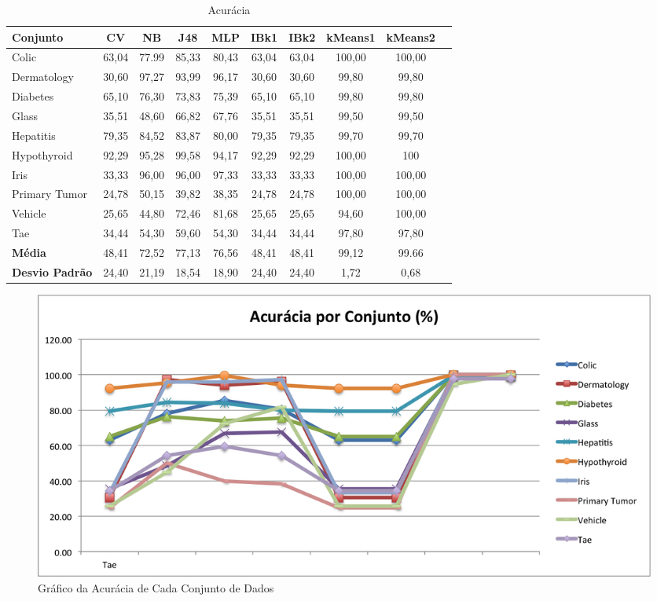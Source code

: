 \documentclass[12pt]{article}
\begin{document}
\begin{table}[h]
	\centering
	\caption{Acurácia }	
	\label{tabelaAcuraciaConjuntoDados}
	\begin{tabular}{lccccccccc}
		\hline
		Conjunto & CV & NB & J48 & MLP & IBk1 & IBk2 & kMeans1 & kMeans2 \\ \hline
		Colic  & 63,04 & 77.99 & 85,33 &80,43 & 63,04 & 63,04 & 100,00 & 100,00 \\ \hline
		Dermatology & 30,60 & 97,27 & 93,99 & 96,17 & 30,60 & 30,60 & 99,80 & 99,80\\ \hline
		Diabetes & 65,10 & 76,30 & 73,83 & 75,39 & 65,10 & 65,10 & 99,80 & 99,80 \\ \hline
		Glass & 35,51 & 48,60 & 66,82 & 67,76 & 35,51 & 35,51 & 99,50 & 99,50 \\ \hline
		Hepatitis & 79,35& 84,52 & 83,87 & 80,00 & 79,35 & 79,35 & 99,70 & 99,70 \\ \hline
		Hypothyroid  & 92,29 & 95,28 & 99,58 & 94,17 & 92,29 & 92,29 & 100,00 & 100 \\ \hline
		Iris & 33,33 & 96,00 & 96,00 & 97,33 & 33,33 & 33,33 & 100,00 & 100,00 \\ \hline
		Primary Tumor & 24,78 & 50,15 & 39,82 & 38,35 & 24,78 & 24,78 & 100,00 & 100,00\\ \hline
		Vehicle & 25,65 & 44,80 & 72,46 &81,68 & 25,65 & 25,65 & 94,60 & 100,00 \\ \hline
		Tae & 34,44 & 54,30 & 59,60 & 54,30 & 34,44 & 34,44 & 97,80 & 97,80 \\ \hline
		\textbf{Média} & 48,41 & 72,52 & 77,13 & 76,56 & 48,41 & 48,41 & 99,12 & 99.66\\ \hline
		\textbf{Desvio Padrão} & 24,40 & 21,19 & 18,54 & 18,90 & 24,40 & 24,40 & 1,72 & 0,68 \\ \hline
	\end{tabular}
\end{table}

\begin{figure}[!h]
\centering
\includegraphics[width=.68\textwidth]{AcuraciaConjunto.png}
\caption{Gráfico da Acurácia de Cada Conjunto de Dados}
\label{fig:acuraciaconjunto}
\end{figure}
\end{document}
